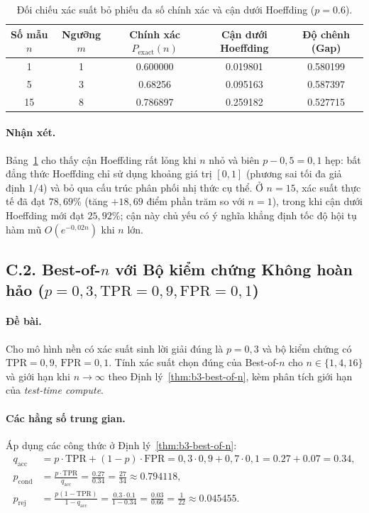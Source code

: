 \begin{table}[htbp]
  \centering
  \caption{Đối chiếu xác suất bỏ phiếu đa số chính xác và cận dưới Hoeffding ($p = 0.6$).}
  \label{tab:c1-comparison}
  \begin{tabular}{ccccc}
    \toprule
    Số mẫu $n$ & Ngưỡng $m$ & Chính xác $P_{\text{exact}}(n)$ & Cận dưới Hoeffding & Độ chênh (Gap) \\
    \midrule
    1  & 1 & 0.600000 & 0.019801 & 0.580199 \\
    5  & 3 & 0.68256  & 0.095163 & 0.587397 \\
    15 & 8 & 0.786897 & 0.259182 & 0.527715 \\
    \bottomrule
  \end{tabular}
\end{table}

\paragraph{Nhận xét.}
Bảng~\ref{tab:c1-comparison} cho thấy cận Hoeffding rất lỏng khi $n$ nhỏ và biên $p - 0{,}5 = 0{,}1$ hẹp: bất đẳng thức Hoeffding chỉ sử dụng khoảng giá trị $[0, 1]$ (phương sai tối đa giả định $1/4$) và bỏ qua cấu trúc phân phối nhị thức cụ thể. Ở $n = 15$, xác suất thực tế đã đạt $78{,}69\%$ (tăng $+18{,}69$ điểm phần trăm so với $n = 1$), trong khi cận dưới Hoeffding mới đạt $25{,}92\%$; cận này chủ yếu có ý nghĩa khẳng định tốc độ hội tụ hàm mũ $O(e^{-0{,}02 n})$ khi $n$ lớn.

\subsection{C.2. Best-of-$n$ với Bộ kiểm chứng Không hoàn hảo ($p = 0{,}3, \text{TPR} = 0{,}9, \text{FPR} = 0{,}1$)}
\label{subsec:c2}

\paragraph{Đề bài.}
Cho mô hình nền có xác suất sinh lời giải đúng là $p = 0{,}3$ và bộ kiểm chứng có $\text{TPR} = 0{,}9$, $\text{FPR} = 0{,}1$. Tính xác suất chọn đúng của Best-of-$n$ cho $n \in \{1, 4, 16\}$ và giới hạn khi $n \to \infty$ theo Định lý~\ref{thm:b3-best-of-n}, kèm phân tích giới hạn của \emph{test-time compute}.

\paragraph{Các hằng số trung gian.}
Áp dụng các công thức ở Định lý~\ref{thm:b3-best-of-n}:
\begin{align*}
  q_{\text{acc}} &= p \cdot \text{TPR} + (1 - p) \cdot \text{FPR} = 0{,}3 \cdot 0{,}9 + 0{,}7 \cdot 0{,}1 = 0.27 + 0.07 = 0.34, \\
  p_{\text{cond}} &= \frac{p \cdot \text{TPR}}{q_{\text{acc}}} = \frac{0.27}{0.34} = \frac{27}{34} \approx 0.794118, \\
  p_{\text{rej}} &= \frac{p(1 - \text{TPR})}{1 - q_{\text{acc}}} = \frac{0.3 \cdot 0.1}{1 - 0.34} = \frac{0.03}{0.66} = \frac{1}{22} \approx 0.045455.
\end{align*}

